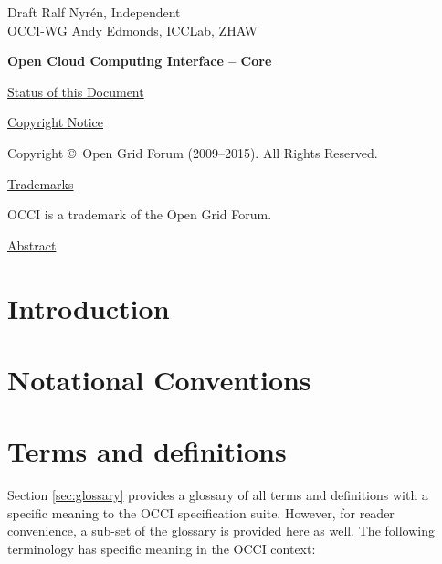 \documentclass[10pt,a4paper]{article}
\begin{document}
\thispagestyle{empty}

Draft \hfill  {Ralf Nyrén, Independent}\\
OCCI-WG \hfill  Andy Edmonds, ICCLab, ZHAW
\\

\vspace*{0.5in}

\begin{Large}
\textbf{Open Cloud Computing Interface -- Core}
\end{Large}

\vspace*{0.5in}

\underline{Status of this Document}



\underline{Copyright Notice}

Copyright \copyright{}~Open Grid Forum (2009--2015). All Rights Reserved.

\underline{Trademarks}

OCCI is a trademark of the Open Grid Forum.

\underline{Abstract}



\newpage
\tableofcontents
\newpage

\section{Introduction}


\section{Notational Conventions}


\section{Terms and definitions}
Section \ref{sec:glossary} provides a glossary of all terms and
definitions with a specific meaning to the OCCI specification
suite. However, for reader convenience, a sub-set of the glossary is
provided here as well. The following terminology has specific meaning
in the OCCI context:
\end{document}

